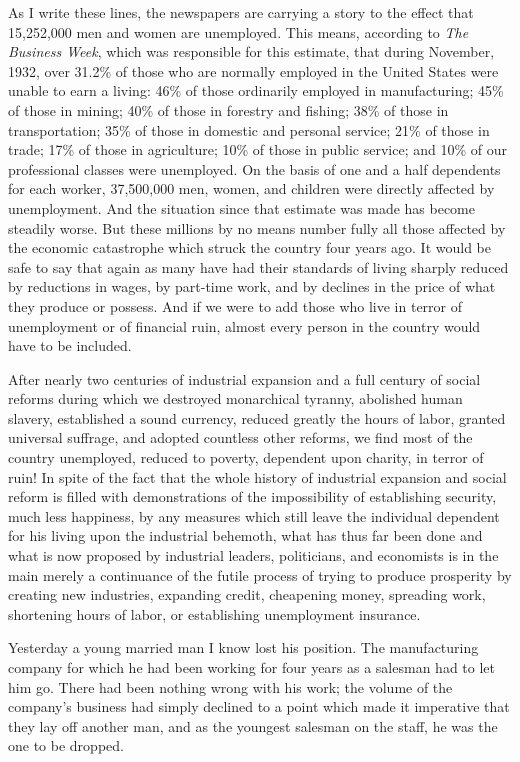 \documentclass{book}
\begin{document}
As I write these lines, the newspapers are carrying a story to the effect that 15,252,000 men and women are unemployed. This means, according to \emph{The Business Week}, which was responsible for this estimate, that during November, 1932, over 31.2\% of those who are normally employed in the United States were unable to earn a living: 46\% of those ordinarily employed in manufacturing; 45\% of those in mining; 40\% of those in forestry and fishing; 38\% of those in transportation; 35\% of those in domestic and personal service; 21\% of those in trade; 17\% of those in agriculture; 10\% of those in public service; and 10\% of our professional classes were unemployed. On the basis of one and a half dependents for each worker, 37,500,000 men, women, and children were directly affected by unemployment. And the situation since that estimate was made has become steadily worse. But these millions by no means number fully all those affected by the economic catastrophe which struck the country four years ago. It would be safe to say that again as many have had their standards of living sharply reduced by reductions in wages, by part-time work, and by declines in the price of what they produce or possess. And if we were to add those who live in terror of unemployment or of financial ruin, almost every person in the country would have to be included.

After nearly two centuries of industrial expansion and a full century of social reforms during which we destroyed monarchical tyranny, abolished human slavery, established a sound currency, reduced greatly the hours of labor, granted universal suffrage, and adopted countless other reforms, we find most of the country unemployed, reduced to poverty, dependent upon charity, in terror of ruin! In spite of the fact that the whole history of industrial expansion and social reform is filled with demonstrations of the impossibility of establishing security, much less happiness, by any measures which still leave the individual dependent for his living upon the industrial behemoth, what has thus far been done and what is now proposed by industrial leaders, politicians, and economists is in the main merely a continuance of the futile process of trying to produce prosperity by creating new industries, expanding credit, cheapening money, spreading work, shortening hours of labor, or establishing unemployment insurance.

Yesterday a young married man I know lost his position. The manufacturing company for which he had been working for four years as a salesman had to let him go. There had been nothing wrong with his work; the volume of the company’s business had simply declined to a point which made it imperative that they lay off another man, and as the youngest salesman on the staff, he was the one to be dropped.
\end{document}
